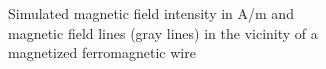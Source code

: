 \begin{figure}[H]
            \begin{subfigure}{0.49\textwidth}
                  \flushleft
                  \caption{Simulated magnetic field intensity in A/m and magnetic field lines (gray lines) in the vicinity of a magnetized ferromagnetic wire \\}\label{fig:sw_mag_field}
          \end{subfigure}\hfill
        \begin{subfigure}{0.49\textwidth}
                \flushright

\end{subfigure}
\end{figure}

